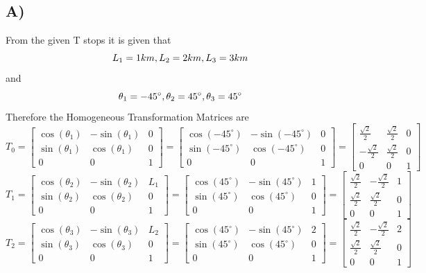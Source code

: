 \documentclass{article}
\begin{document}
\subsection*{A)}
From the given T stops it is given that
$$L_1=1km, \space L_2=2km, \space L_3=3km$$
and
$$\theta_1=-45^\circ, \space \theta_2=45^\circ, \space \theta_3=45^\circ$$
Therefore the Homogeneous Transformation Matrices are
\[
	T_0= \begin{bmatrix}
		\cos(\theta_1) & -\sin(\theta_1) & 0 \\
		\sin(\theta_1) & \cos(\theta_1)  & 0 \\
		0              & 0               & 1
	\end{bmatrix}
	=
	\begin{bmatrix}
		\cos(-45^\circ) & -\sin(-45^\circ) & 0 \\
		\sin(-45^\circ) & \cos(-45^\circ)  & 0 \\
		0               & 0                & 1
	\end{bmatrix}
	=
	\begin{bmatrix}
		\frac{\sqrt{2}}{2}  & \frac{\sqrt{2}}{2} & 0 \\
		-\frac{\sqrt{2}}{2} & \frac{\sqrt{2}}{2} & 0 \\
		0                   & 0                  & 1
	\end{bmatrix}
\]
\[
	T_1= \begin{bmatrix}
		\cos(\theta_2) & -\sin(\theta_2) & L_1 \\
		\sin(\theta_2) & \cos(\theta_2)  & 0   \\
		0              & 0               & 1
	\end{bmatrix}
	=
	\begin{bmatrix}
		\cos(45^\circ) & -\sin(45^\circ) & 1 \\
		\sin(45^\circ) & \cos(45^\circ)  & 0 \\
		0              & 0               & 1
	\end{bmatrix}
	=
	\begin{bmatrix}
		\frac{\sqrt{2}}{2} & -\frac{\sqrt{2}}{2} & 1 \\
		\frac{\sqrt{2}}{2} & \frac{\sqrt{2}}{2}  & 0 \\
		0                  & 0                   & 1
	\end{bmatrix}
\]
\[
	T_2= \begin{bmatrix}
		\cos(\theta_3) & -\sin(\theta_3) & L_2 \\
		\sin(\theta_3) & \cos(\theta_3)  & 0   \\
		0              & 0               & 1
	\end{bmatrix}
	=
	\begin{bmatrix}
		\cos(45^\circ) & -\sin(45^\circ) & 2 \\
		\sin(45^\circ) & \cos(45^\circ)  & 0 \\
		0              & 0               & 1
	\end{bmatrix}
	=
	\begin{bmatrix}
		\frac{\sqrt{2}}{2} & -\frac{\sqrt{2}}{2} & 2 \\
		\frac{\sqrt{2}}{2} & \frac{\sqrt{2}}{2}  & 0 \\
		0                  & 0                   & 1
	\end{bmatrix}
\]
\end{document}
